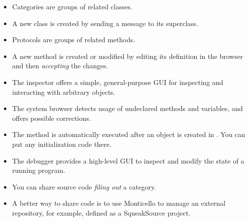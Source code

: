 \documentclass[a4paper,10pt,twoside]{book}
\begin{document}
\begin{itemize}
  \item Categories are groups of related classes.
  \item A new class is created by sending a message to its superclass.
  \item Protocols are groups of related methods.
  \item A new method is created or modified by editing its definition in the browser and then \emph{accepting} the changes.
  \item The inspector offers a simple, general-purpose GUI for inspecting and interacting with arbitrary objects.
  \item The system browser detects usage of undeclared methods and variables, and offers possible corrections.
  \item The  method is automatically executed after an object is created in \squeak.
  You can put any initialization code there.
  \item The debugger provides a high-level GUI to inspect and modify the state of a running program.
  \item You can share source code \emph{filing out} a category.
  \item A better way to share code is to use Monticello to manage an external repository, for example, defined as a SqueakSource project.
\end{itemize}

\ifx\wholebook\relax\else
\end{document}
